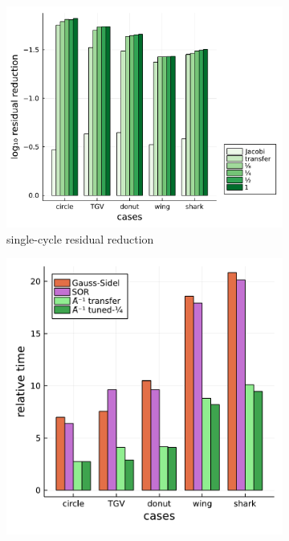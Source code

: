 \documentclass[]{elsarticle}
\begin{document}
\begin{figure}
    \centering
    \begin{subfigure}[b]{0.52\textwidth}
        \centering
        \includegraphics[width=\textwidth]{figures/scaleloss}
        \caption{single-cycle residual reduction}
        \label{fig:scaled loss}
    \end{subfigure}
    \hfill
    \begin{subfigure}[b]{0.42\textwidth}
        \centering
        \includegraphics[width=\textwidth]{figures/crosscount}

\end{subfigure}
\end{figure}
\end{document}
